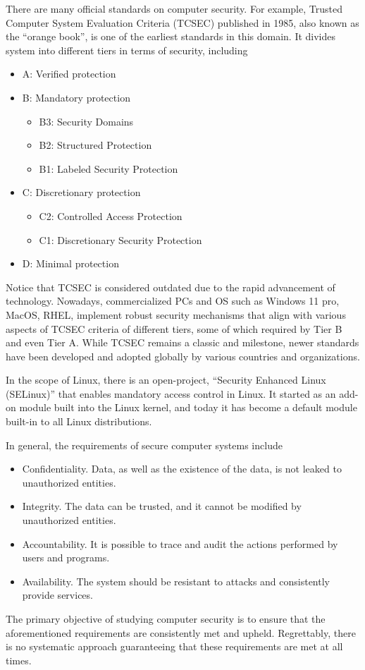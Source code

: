 There are many official standards on computer security. For example, Trusted Computer System Evaluation Criteria (TCSEC) published in 1985, also known as the ``orange book'', is one of the earliest standards in this domain. It divides system into different tiers in terms of security, including
\begin{itemize}
	\item A: Verified protection
	\item B: Mandatory protection
	\begin{itemize}
		\item B3: Security Domains
		\item B2: Structured Protection
		\item B1: Labeled Security Protection
	\end{itemize}
	\item C: Discretionary protection
	\begin{itemize}
		\item C2: Controlled Access Protection
		\item C1: Discretionary Security Protection
	\end{itemize}
	\item D: Minimal protection
\end{itemize}
Notice that TCSEC is considered outdated due to the rapid advancement of technology. Nowadays, commercialized PCs and OS such as Windows 11 pro, MacOS, RHEL, implement robust security mechanisms that align with various aspects of TCSEC criteria of different tiers, some of which required by Tier B and even Tier A. While TCSEC remains a classic and milestone, newer standards have been developed and adopted globally by various countries and organizations.

In the scope of Linux, there is an open-project, ``Security Enhanced Linux (SELinux)'' that enables mandatory access control in Linux. It started as an add-on module built into the Linux kernel, and today it has become a default module built-in to all Linux distributions.

In general, the requirements of secure computer systems include
\begin{itemize}
	\item Confidentiality. Data, as well as the existence of the data, is not leaked to unauthorized entities.
	\item Integrity. The data can be trusted, and it cannot be modified by unauthorized entities.
	\item Accountability. It is possible to trace and audit the actions performed by users and programs.
	\item Availability. The system should be resistant to attacks and consistently provide services.
\end{itemize} 
The primary objective of studying computer security is to ensure that the aforementioned requirements are consistently met and upheld. Regrettably, there is no systematic approach guaranteeing that these requirements are met at all times.

